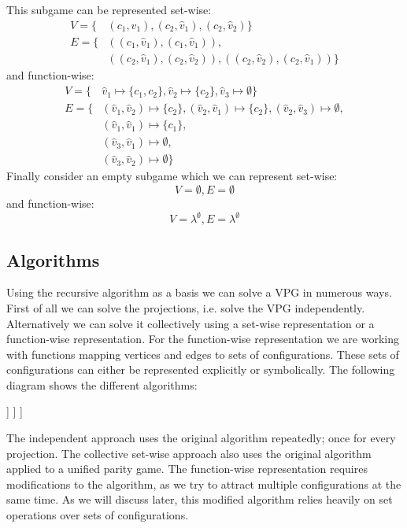 \begin{example}
\begin{center}
	\end{center}
	This subgame can be represented set-wise:
	\begin{align*}
	V = \{&(c_1,\hat{v}_1),(c_2,\hat{v}_1),(c_2,\hat{v}_2) \}\\
	E = \{& ((c_1,\hat{v}_1),(c_1,\hat{v}_1)), \\
	&((c_2,\hat{v}_1),(c_2,\hat{v}_2)),((c_2,\hat{v}_2),(c_2,\hat{v}_1)) \}
	\end{align*}
	and function-wise:
	\begin{align*}
	V = \{&\hat{v}_1 \mapsto \{c_1,c_2\},\hat{v}_2 \mapsto \{c_2\},\hat{v}_3 \mapsto \emptyset\}\\
	E = \{&(\hat{v}_1,\hat{v}_2) \mapsto \{c_2\},(\hat{v}_2,\hat{v}_1) \mapsto \{c_2\},(\hat{v}_2,\hat{v}_3) \mapsto \emptyset,\\
	&(\hat{v}_1,\hat{v}_1) \mapsto \{c_1\},\\
	&(\hat{v}_3,\hat{v}_1) \mapsto \emptyset,\\
	&(\hat{v}_3,\hat{v}_2) \mapsto \emptyset\}
	\end{align*}
	Finally consider an empty subgame which we can represent set-wise:
	\[ V = \emptyset, E = \emptyset \]
	and function-wise:
	\[ V = \lambda^\emptyset, E = \lambda^\emptyset \]
\end{example}

\subsection{Algorithms}
Using the recursive algorithm as a basis we can solve a VPG in numerous ways. First of all we can solve the projections, i.e. solve the VPG independently. Alternatively we can solve it collectively using a set-wise representation or a function-wise representation. For the function-wise representation we are working with functions mapping vertices and edges to sets of configurations. These sets of configurations can either be represented explicitly or symbolically. The following diagram shows the different algorithms:
\begin{center}
	\begin{forest}
		[Recursive algorithm, for tree={parent anchor=south, child anchor=north, align=center, s sep=5mm}
		[Independent]
		[Collective
		[Set-wise]
		[Function-wise
		[Explicit]
		[Symbolic]
		]
		]
		]
	\end{forest}
\end{center}
The independent approach uses the original algorithm repeatedly; once for every projection. The collective set-wise approach also uses the original algorithm applied to a unified parity game. The function-wise representation requires modifications to the algorithm, as we try to attract multiple configurations at the same time. As we will discuss later, this modified algorithm relies heavily on set operations over sets of configurations. 


